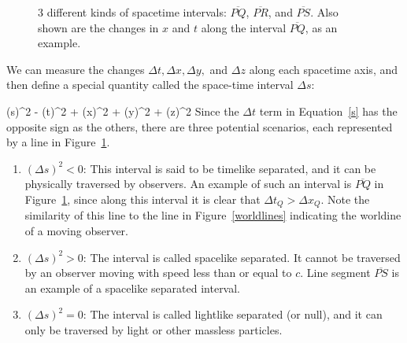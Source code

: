 \documentclass[11pt]{article}
\begin{document}
\begin{figure}[h!]
		\caption{3 different kinds of spacetime intervals: $\overline{PQ}$, $\overline{PR}$, and $\overline{PS}$. Also shown are the changes in $x$ and $t$ along the interval $\overline{PQ}$, as an example.}
		\label{intervals}
	\end{figure}

 We can measure the changes $\Delta t, \Delta x, \Delta y,$ and $\Delta z$ along each spacetime axis, and then define a special quantity called the space-time interval $\Delta s$:

\beq
(\Delta s)^2 \equiv - (\Delta t)^2 + (\Delta x)^2 + (\Delta y)^2 + (\Delta z)^2
\label{s}
\eeq Since the $\Delta t$ term in Equation~\ref{s} has the opposite sign as the others, there are three potential scenarios, each represented by a line in Figure~\ref{intervals}.

\begin{enumerate}
	\item $(\Delta s)^2 < 0$: This interval is said to be timelike separated, and it can be physically traversed by observers. An example of such an interval is $\overline{PQ}$ in Figure~\ref{intervals}, since along this interval it is clear that $\Delta t_Q > \Delta x_Q$. Note the similarity of this line to the line in Figure~\ref{worldlines} indicating the worldine of a moving observer.
	
	\item $(\Delta s)^2 > 0$: The interval is called spacelike separated. It cannot be traversed by an observer moving with speed less than or equal to $c$. Line segment $\overline{PS}$ is an example of a spacelike separated interval.
	
	\item $(\Delta s)^2 = 0$: The interval is called lightlike separated (or null), and it can only be traversed by light or other massless particles.
\end{enumerate}
\end{document}
